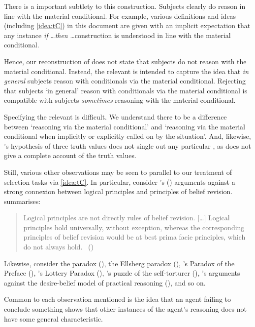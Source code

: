 \begin{note}
  There is a important subtlety to this construction.
  Subjects clearly do reason in line with the material conditional.
  For example, various definitions and ideas (including \autoref{idea:tC}) in this document are given with an implicit expectation that any instance \emph{if} \dots \emph{then} \dots construction is understood in line with the material conditional.

  Hence, our reconstruction of \citeauthor{Wason:1966aa} does not state that subjects do not reason with the material conditional.
  Instead, the relevant \torN{} is intended to capture the idea that \emph{in general} subjects reason with conditionals via the material conditional.
  Rejecting that subjects `in general' reason with conditionals via the material conditional is compatible with subjects \emph{sometimes} reasoning with the material conditional.

  Specifying the relevant \torN{} is difficult.
  We understand there to be a difference between `reasoning via the material conditional' and `reasoning via the material conditional when implicitly or explicitly called on by the situation'.
  And, likewise, \citeauthor{Wason:1966aa}'s hypothesis of three truth values does not single out any particular \torN{}, as \citeauthor{Wason:1966aa} does not give a complete account of the truth values.

  Still, various other observations may be seen to parallel to our treatment of selection tasks via \autoref{idea:tC}.
  In particular, consider \citeauthor{Harman:1984aa}'s (\citeyear{Harman:1984aa,Harman:1986ux}) arguments against a strong connexion between logical principles and principles of belief revision.
  \citeauthor{Harman:1984aa} summarises:
  \begin{quote}
    Logical principles are not directly rules of belief revision.
    [\dots]
    Logical principles hold universally, without exception, whereas the corresponding principles of belief revision would be at best prima facie principles, which do not always hold.%
    \mbox{ }\hfill\mbox{(\citeyear[107--108]{Harman:1984aa})}
  \end{quote}
  Likewise, consider the \citeauthor{Allais:1979aa} paradox (\cite{Allais:1979aa}),
  the Ellsberg paradox (\cite{Ellsberg:1961aa}), \citeauthor{Makinson:1965aa}'s Paradox of the Preface (\citeyear{Makinson:1965aa}), \citeauthor{Kyburg:1997aa}'s Lottery Paradox (\citeyear{Kyburg:1997aa}), \citeauthor{Quinn:1990aa}'s  puzzle of the self-torturer (\citeyear{Quinn:1990aa}), \citeauthor{Bratman:1981aa}'s arguments against the desire-belief model of practical reasoning (\citeyear{Bratman:1981aa,Bratman:1987aa}), and so on.

  Common to each observation mentioned is the idea that an agent failing to conclude something shows that other instances of the agent's reasoning does not have some general characteristic.
\end{note}


